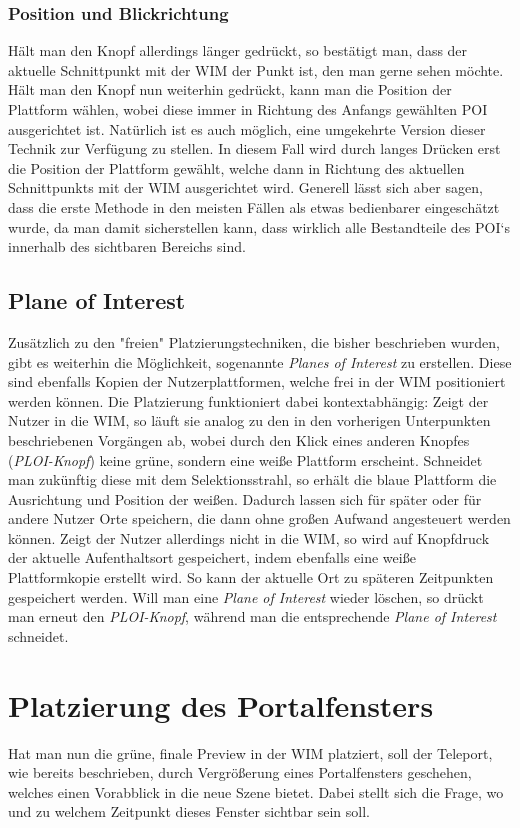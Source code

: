 \subsubsection{Position und Blickrichtung}
Hält man den Knopf allerdings länger gedrückt, so bestätigt man, dass der aktuelle Schnittpunkt mit der WIM der Punkt ist, den man gerne sehen möchte. Hält man den Knopf nun weiterhin gedrückt, kann man die Position der Plattform wählen, wobei diese immer in Richtung des Anfangs gewählten POI ausgerichtet ist.
Natürlich ist es auch möglich, eine umgekehrte Version dieser Technik zur Verfügung zu stellen. In diesem Fall wird durch langes Drücken erst die Position der Plattform gewählt, welche dann in Richtung des aktuellen Schnittpunkts mit der WIM ausgerichtet wird. 
Generell lässt sich aber sagen, dass die erste Methode in den meisten Fällen als etwas bedienbarer eingeschätzt wurde, da man damit sicherstellen kann, dass wirklich alle Bestandteile des POI`s innerhalb des sichtbaren Bereichs sind.

\subsection{Plane of Interest}
Zusätzlich zu den "freien" Platzierungstechniken, die bisher beschrieben wurden, gibt es weiterhin die Möglichkeit, sogenannte \textit{Planes of Interest} zu erstellen. Diese sind ebenfalls Kopien der Nutzerplattformen, welche frei in der WIM positioniert werden können. Die Platzierung funktioniert dabei kontextabhängig:
Zeigt der Nutzer in die WIM, so läuft sie analog zu den in den vorherigen Unterpunkten beschriebenen Vorgängen ab, wobei durch den Klick eines anderen Knopfes (\textit{PLOI-Knopf}) keine grüne, sondern eine weiße Plattform erscheint. Schneidet man zukünftig diese mit dem Selektionsstrahl, so erhält die blaue Plattform die Ausrichtung und Position der weißen. Dadurch lassen sich für später oder für andere Nutzer Orte speichern, die dann ohne großen Aufwand angesteuert werden können.
Zeigt der Nutzer allerdings nicht in die WIM, so wird auf Knopfdruck der aktuelle Aufenthaltsort gespeichert, indem ebenfalls eine weiße Plattformkopie erstellt wird. So kann der aktuelle Ort zu späteren Zeitpunkten gespeichert werden.
Will man eine \textit{Plane of Interest} wieder löschen, so drückt man erneut den \textit{PLOI-Knopf}, während man die entsprechende \textit{Plane of Interest} schneidet.


\section{Platzierung des Portalfensters}
Hat man nun die grüne, finale Preview in der WIM platziert, soll der Teleport, wie bereits beschrieben, durch Vergrößerung eines Portalfensters geschehen, welches einen Vorabblick in die neue Szene bietet. Dabei stellt sich die Frage, wo und zu welchem Zeitpunkt dieses Fenster sichtbar sein soll.

